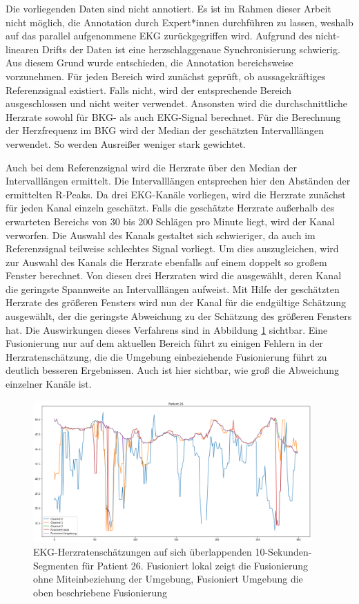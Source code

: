	Die vorliegenden Daten sind nicht annotiert. Es ist im Rahmen dieser Arbeit nicht möglich, die Annotation durch Expert*innen durchführen zu lassen, weshalb auf das parallel aufgenommene \ac{EKG} zurückgegriffen wird. Aufgrund des nicht-linearen Drifts der Daten ist eine herzschlaggenaue Synchronisierung schwierig. Aus diesem Grund wurde entschieden, die Annotation bereichsweise vorzunehmen. Für jeden Bereich wird zunächst geprüft, ob aussagekräftiges Referenzsignal existiert. Falls nicht, wird der entsprechende Bereich ausgeschlossen und nicht weiter verwendet. Ansonsten wird die durchschnittliche Herzrate sowohl für BKG- als auch EKG-Signal berechnet. Für die Berechnung der Herzfrequenz im \ac{BKG} wird der Median der geschätzten Intervalllängen verwendet. So werden Ausreißer weniger stark gewichtet.
	
	Auch bei dem Referenzsignal wird die Herzrate über den Median der Intervalllängen ermittelt. Die Intervalllängen entsprechen hier den Abständen der ermittelten R-Peaks. Da drei \ac{EKG}-Kanäle vorliegen, wird die Herzrate zunächst für jeden Kanal einzeln geschätzt. Falls die geschätzte Herzrate außerhalb des erwarteten Bereichs von 30 bis 200 Schlägen pro Minute liegt, wird der Kanal verworfen. Die Auswahl des Kanals gestaltet sich schwieriger, da auch im Referenzsignal teilweise schlechtes Signal vorliegt. Um dies auszugleichen, wird zur Auswahl des Kanals die Herzrate ebenfalls auf einem doppelt so großem Fenster berechnet. Von diesen drei Herzraten wird die ausgewählt, deren Kanal die geringste Spannweite an Intervalllängen aufweist. Mit Hilfe der geschätzten Herzrate des größeren Fensters wird nun der Kanal für die endgültige Schätzung ausgewählt, der die geringste Abweichung zu der Schätzung des größeren Fensters hat. Die Auswirkungen dieses Verfahrens sind in Abbildung \ref{fig:ecg-patient-26} sichtbar. Eine Fusionierung nur auf dem aktuellen Bereich führt zu einigen Fehlern in der Herzratenschätzung, die die Umgebung einbeziehende Fusionierung führt zu deutlich besseren Ergebnissen. Auch ist hier sichtbar, wie groß die Abweichung einzelner Kanäle ist.
	
	\begin{figure}[H]
		\centering
		\includegraphics[width=0.95\textwidth]{pic/ecg-patient-26.png}
		\caption[\ac{EKG}-Herzratenschätzungen auf sich überlappenden 10-Sekunden-Segmenten für Patient 26]{\ac{EKG}-Herzratenschätzungen auf sich überlappenden 10-Sekunden-Segmenten für Patient 26. Fusioniert lokal zeigt die Fusionierung ohne Miteinbeziehung der Umgebung, Fusioniert Umgebung die oben beschriebene Fusionierung}
		\label{fig:ecg-patient-26}
	\end{figure}


